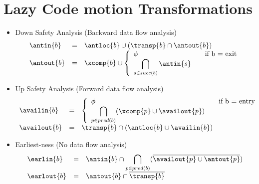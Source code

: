 \appendix
\chapter{Lazy Code motion Transformations}

\begin{itemize}
\item Down Safety Analysis (Backward data flow analysis)
\begin{equation}
\begin{array}{l c l}
\antin{b} &=& \antloc{b} \cup (\transp{b} \cap \antout{b}) \\
\antout{b} &=& \xcomp{b} \cup \left\{
                    \begin{array}{l l}
                        \phi & \quad \text{if b = exit}\\
                        \displaystyle \bigcap_{s \in succ(b)} \antin{s} &
                    \end{array} \right. \\
\end{array}
\end{equation}

\item Up Safety Analysis (Forward data flow analysis)
\begin{equation}
\begin{array}{l c l}
\availin{b} &=& \left\{
                  \begin{array}{l l}
                        \phi & \quad \text{if b = entry}\\
                        \displaystyle \bigcap_{p \in pred(b)} (\xcomp{p} \cup \availout{p}) & 
                  \end{array} 
              \right. \\
\availout{b} &=& \transp{b} \cap (\antloc{b} \cup \availin{b}) \\
\end{array}
\end{equation}

\item Earliest-ness (No data flow analysis)
\begin{equation}
\begin{array}{l c l}
\earlin{b}  &=& \antin{b} \cap \displaystyle \bigcap_{p \in pred(b)} (\overline{\availout{p} \cup \antout{p}}) \\ 
\earlout{b} &=& \antout{b} \cap \overline{\transp{b}}
\end{array}
\end{equation}


\end{itemize}
